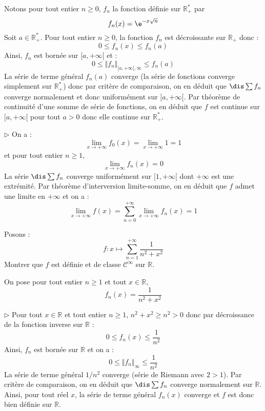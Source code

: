 \documentclass[a4paper,10pt]{report}
\begin{document}
\medskip

\noindent Notons pour tout entier $n \geq 0$, $f_n$ la fonction définie sur $\mathbb{R}_+^*$ par 
$$f_n(x)= \e^{ - x\sqrt n}$$
Soit $a \in \mathbb{R}_+^*$. Pour tout entier $n \geq 0$, la fonction $f_n$ est décroissante sur $\mathbb{R}_+$ donc :
$$ 0 \leq f_n(x) \leq f_n(a)$$
Ainsi, $f_n$ est bornée sur $[a, + \infty[$ et :
$$ 0 \leq \Vert f_n \Vert_{[a, + \infty[, \infty} \leq f_n(a)$$
La série de terme général $f_n(a)$ converge (la série de fonctions converge simplement sur $\mathbb{R}_+^*$) donc par critère de comparaison, on en déduit que $\dis \sum f_n$ converge normalement et donc uniformément sur $[a, + \infty[$. Par théorème de continuité d'une somme de série de fonctions, on en déduit que $f$ est continue sur $[a, + \infty[$ pour tout $a>0$ donc elle continue sur $\mathbb{R}_+^*$.

\medskip

\noindent $\rhd$ On a :
$$ \lim_{x \rightarrow + \infty} f_0(x) = \lim_{x \rightarrow + \infty} 1 = 1$$
et pour tout entier $n \geq 1$,
$$ \lim_{x \rightarrow + \infty} f_n(x) = 0$$
La série $\dis \sum f_n$ converge uniformément sur $[1, + \infty[$ dont $+ \infty$ est une extrémité. Par théorème d'interversion limite-somme, on en déduit que $f$ admet une limite en $+ \infty$ et on a :
$$ \lim_{x \rightarrow + \infty} f(x) = \sum_{n=0}^{+ \infty} \lim_{x \rightarrow + \infty} f_n(x) = 1$$

\begin{Exercice}{} Posons :
$$f: x \mapsto \sum_{n=1}^{+ \infty} \dfrac{1}{n^2+x^2}$$
Montrer que $f$ est définie et de classe $\mathcal{C}^{\infty}$ sur $\mathbb{R}$.
\end{Exercice} 

\corr On pose pour tout entier $n \geq 1$ et tout $x \in \mathbb{R}$,
$$ f_n(x) = \dfrac{1}{n^2+x^2}$$

\medskip

\noindent $\rhd$ Pour tout $x \in \mathbb{R}$ et tout entier $n \geq 1$, $n^2+x^2 \geq n^2>0$ donc par décroissance de la fonction inverse sur $\mathbb{R}$ :
$$ 0 \leq f_n(x) \leq \dfrac{1}{n^2}$$
Ainsi, $f_n$ est bornée sur $\mathbb{R}$ et on a :
$$ 0 \leq \Vert f_n \Vert_{\infty} \leq \dfrac{1}{n^2}$$
La série de terme général $1/n^2$ converge (série de Riemann avec $2>1$). Par critère de comparaison, on en déduit que $\dis \sum f_n$ converge normalement sur $\mathbb{R}$. Ainsi, pour tout réel $x$, la série de terme général $f_n(x)$ converge et $f$ est donc bien définie sur $\mathbb{R}$.
\end{document}
